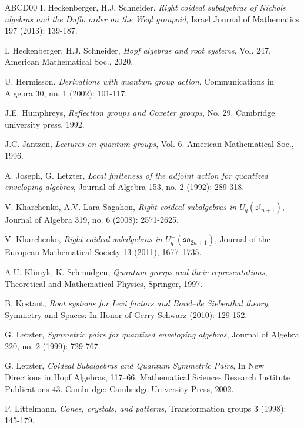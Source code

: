 \documentclass[a4paper, 12pt, reqno, english]{amsart}
\numberwithin{equation}{section}
\numberwithin{figure}{section}
\theoremstyle{plain}
\theoremstyle{plain}
\theoremstyle{plain}
\theoremstyle{plain}
\theoremstyle{plain}
\theoremstyle{definition}
\theoremstyle{definition}
\theoremstyle{definition}
\theoremstyle{remark}
\theoremstyle{definition}
\theoremstyle{definition}
\begin{document}
\begin{thebibliography}{ABCD00}
I. Heckenberger, H.J. Schneider,
\textit{Right coideal subalgebras of Nichols algebras and the Duflo order on the Weyl groupoid},
Israel Journal of Mathematics 197 (2013): 139-187.

I. Heckenberger, H.J. Schneider,
\textit{Hopf algebras and root systems},
Vol. 247. American Mathematical Soc., 2020.

U. Hermisson,
\textit{Derivations with quantum group action},
Communications in Algebra 30, no. 1 (2002): 101-117.

J.E. Humphreys,
\textit{Reflection groups and Coxeter groups},
No. 29. Cambridge university press, 1992.

J.C. Jantzen,
\textit{Lectures on quantum groups},
Vol. 6. American Mathematical Soc., 1996.

A. Joseph, G. Letzter,
\textit{Local finiteness of the adjoint action for quantized enveloping algebras},
Journal of Algebra 153, no. 2 (1992): 289-318.

V. Kharchenko, A.V. Lara Sagahon,
\textit{Right coideal subalgebras in $U_q(\mathfrak{sl}_{n + 1})$},
Journal of Algebra 319, no. 6 (2008): 2571-2625.

V. Kharchenko,
\textit{Right coideal subalgebras in $U_q^+(\mathfrak{so}_{2 n + 1})$},
Journal of the European Mathematical Society 13 (2011), 1677–1735.

A.U. Klimyk, K. Schmüdgen,
\textit{Quantum groups and their representations},
Theoretical and Mathematical Physics, Springer, 1997.

B. Kostant,
\textit{Root systems for Levi factors and Borel–de Siebenthal theory},
Symmetry and Spaces: In Honor of Gerry Schwarz (2010): 129-152.

G. Letzter,
\textit{Symmetric pairs for quantized enveloping algebras},
Journal of Algebra 220, no. 2 (1999): 729-767.

G. Letzter,
\textit{Coideal Subalgebras and Quantum Symmetric Pairs},
In New Directions in Hopf Algebras, 117–66. Mathematical Sciences Research Institute Publications 43. Cambridge:
Cambridge University Press, 2002.

P. Littelmann,
\textit{Cones, crystals, and patterns},
Transformation groups 3 (1998): 145-179.


\end{thebibliography}
\end{document}
